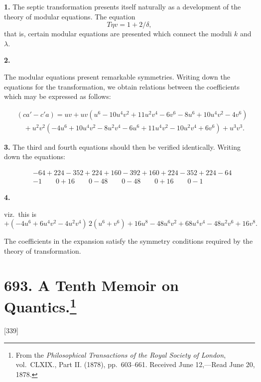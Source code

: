 \documentclass[11pt,a4paper]{book}
\begin{document}
\medskip
\noindent\textbf{1.}\quad
The septic transformation presents itself naturally as a development of the theory of modular equations. The equation
\[
T\eta v = 1 + 2/\delta,
\]
that is, certain modular equations are presented which connect the moduli $k$ and $\lambda$.

\medskip
\noindent\textbf{2.}

The modular equations present remarkable symmetries. Writing down the equations for the transformation, we obtain relations between the coefficients which may be expressed as follows:

\begin{align*}
&(ca' - c'a) = uv + uv(u^6 - 10u^4v^2 + 11u^2v^4 - 6v^6 - 8u^6 + 10u^4v^2 - 4v^6)\\
&\quad + u^2v^2(-4u^6 + 10u^4v^2 - 8u^2v^4 - 6u^6 + 11u^4v^2 - 10u^2v^4 + 6v^6) + u^3v^3.
\end{align*}

\medskip
\noindent\textbf{3.}\quad
The third and fourth equations should then be verified identically. Writing down the equations:

\begin{align*}
&-64 + 224 - 352 + 224 + 160 - 392 + 160 + 224 - 352 + 224 - 64\\
&-1 \qquad 0 + 16 \qquad 0 - 48 \qquad 0 - 48 \qquad 0 + 16 \qquad 0 - 1
\end{align*}

\medskip
\noindent\textbf{4.}

viz.\ this is
\[
+ (-4u^6 + 6u^4v^2 - 4u^2v^4)\, 2(u^6 + v^6) + 16u^8 - 48u^6v^2 + 68u^4v^4 - 48u^2v^6 + 16v^8.
\]

The coefficients in the expansion satisfy the symmetry conditions required by the theory of transformation.

\newpage
\section[A Tenth Memoir on Quantics]{693. A Tenth Memoir on Quantics.\footnote{From the \textit{Philosophical Transactions of the Royal Society of London}, vol.\ CLXIX., Part II. (1878), pp.\ 603--661. Received June 12,---Read June 20, 1878.}}

[339]
\end{document}
